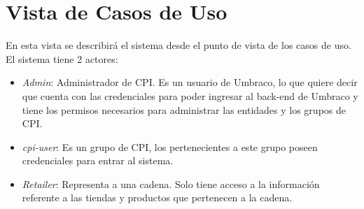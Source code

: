     \section{Vista de Casos de Uso} \label{vistaCasosDeUso}
    En esta vista se describirá el sistema desde el punto de vista de los casos de uso. El sistema tiene 2 actores:

    \begin{itemize}
        \item \emph{Admin}: Administrador de CPI. Es un usuario de Umbraco, lo que quiere decir que cuenta con las credenciales para poder ingresar al back-end de Umbraco y tiene los permisos necesarios para administrar las entidades y los grupos de CPI.
        \item \emph{cpi-user}: Es un grupo de CPI, los pertenecientes a este grupo poseen credenciales para entrar al sistema.
        \item \emph{Retailer}: Representa a una cadena. Solo tiene acceso a la información referente a las tiendas y productos que pertenecen a la cadena.
         \end{itemize}

